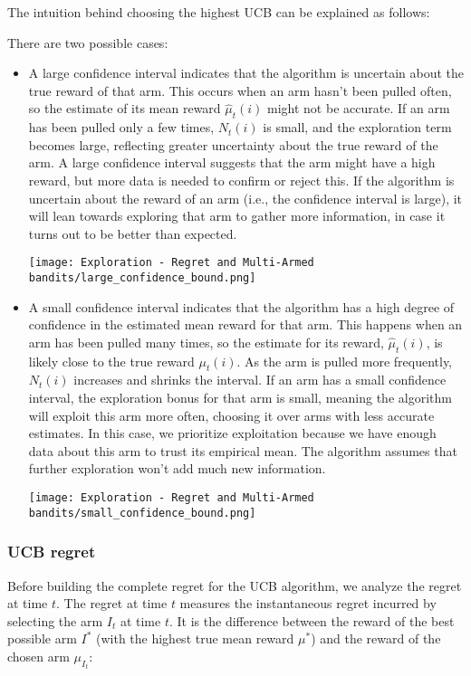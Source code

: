 The intuition behind choosing the highest UCB can be explained as follows:

There are two possible cases:

\begin{itemize}
    \item A large confidence interval indicates that the algorithm is uncertain about the true reward of that arm. This occurs when an arm hasn’t been pulled often, so the estimate of its mean reward $\hat{\mu}_t(i)$ might not be accurate. If an arm has been pulled only a few times, $N_t(i)$ is small, and the exploration term becomes large, reflecting greater uncertainty about the true reward of the arm. A large confidence interval suggests that the arm might have a high reward, but more data is needed to confirm or reject this. If the algorithm is uncertain about the reward of an arm (i.e., the confidence interval is large), it will lean towards exploring that arm to gather more information, in case it turns out to be better than expected. \begin{center} \texttt{[image: Exploration - Regret and Multi-Armed bandits/large\_confidence\_bound.png]} \end{center}
    \item A small confidence interval indicates that the algorithm has a high degree of confidence in the estimated mean reward for that arm. This happens when an arm has been pulled many times, so the estimate for its reward, $\hat{\mu}_t(i)$, is likely close to the true reward $\mu_t(i)$. As the arm is pulled more frequently, $N_t(i)$ increases and shrinks the interval. If an arm has a small confidence interval, the exploration bonus for that arm is small, meaning the algorithm will exploit this arm more often, choosing it over arms with less accurate estimates. In this case, we prioritize exploitation because we have enough data about this arm to trust its empirical mean. The algorithm assumes that further exploration won’t add much new information. \begin{center}\texttt{[image: Exploration - Regret and Multi-Armed bandits/small\_confidence\_bound.png]} \end{center}
\end{itemize}


\subsubsection{UCB regret}

Before building the complete regret for the UCB algorithm, we analyze the regret at time $t$. The regret at time $t$ measures the instantaneous regret incurred by selecting the arm $I_t$ at time $t$. It is the difference between the reward of the best possible arm $I^*$ (with the highest true mean reward $\mu^*$) and the reward of the chosen arm $\mu_{I_t}$:


